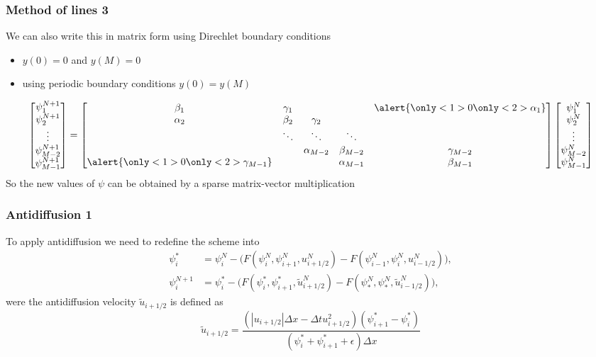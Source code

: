 \documentclass[hyperref={pdfstartview=Fit}]{beamer}
\providecommand{\abs}[1]{\left\lvert#1\right\rvert}
\begin{document}
\begin{frame}
\frametitle{Method of lines 3}
We can also write this in matrix form using Direchlet boundary conditions
\begin{itemize}
\item {}\alert{$y(0)=0$ and $y(M)=0$}
\item {}\alert{using periodic boundary conditions $y(0)=y(M)$}
\end{itemize}
\begin{equation*}
\begin{bmatrix}\psi_{1}^{N+1}\\\psi_{2}^{N+1}\\ \vdots \\\psi_{M-2}^{N+1}\\\psi_{M-1}^{N+1}\end{bmatrix} =
\begin{bmatrix}\beta_1&\gamma_1&&&\alert{\only<1>{0}\only<2>{\alpha_1}}\\ \alpha_2&\beta_2&\gamma_2\\ &\ddots&\ddots&\ddots\\&&\alpha_{M-2}&\beta_{M-2}&\gamma_{M-2}\\\alert{\only<1>{0}\only<2>{\gamma_{M-1}}}&&&\alpha_{M-1}&\beta_{M-1}\\ \end{bmatrix}
\begin{bmatrix}\psi_{1}^N\\\psi_{2}^N\\ \vdots \\\psi_{M-2}^N\\\psi_{M-1}^N\end{bmatrix}
\end{equation*}
So the new values of $\psi$ can be obtained by a sparse matrix-vector multiplication 
\end{frame}

\begin{frame}
\frametitle{Antidiffusion 1}
To apply antidiffusion we need to redefine the scheme into
\begin{align*}
 \psi_i^{*} &= \psi_i^N - \Big( F \left( \psi_i^N,\psi_{i+1}^N,u_{i+1/2}^N\right)
-F \left( \psi_{i-1}^N,\psi_{i}^N,u_{i-1/2}^N\right) \Big),\\
 \psi_i^{N+1} &= \psi_i^* - \Big( F \left( \psi_i^*,\psi_{i+1}^*,\tilde{u}_{i+1/2}^N\right)
-F \left( \psi_{*}^N,\psi_{*}^N,\tilde{u}_{i-1/2}^N\right) \Big),\
\end{align*}
were the antidiffusion velocity $\tilde{u}_{i+1/2}$ is defined as
\begin{equation*}
\tilde{u}_{i+1/2} = \frac{\left(\abs{u_{i+1/2}}\Delta x - \Delta t u_{i+1/2}^2 \right) \left( \psi_{i+1}^*-\psi_i^*\right)}{ \left( \psi_i^*+\psi_{i+1}^*+\epsilon \right) \Delta x}
\end{equation*}
\end{frame}
\end{document}
